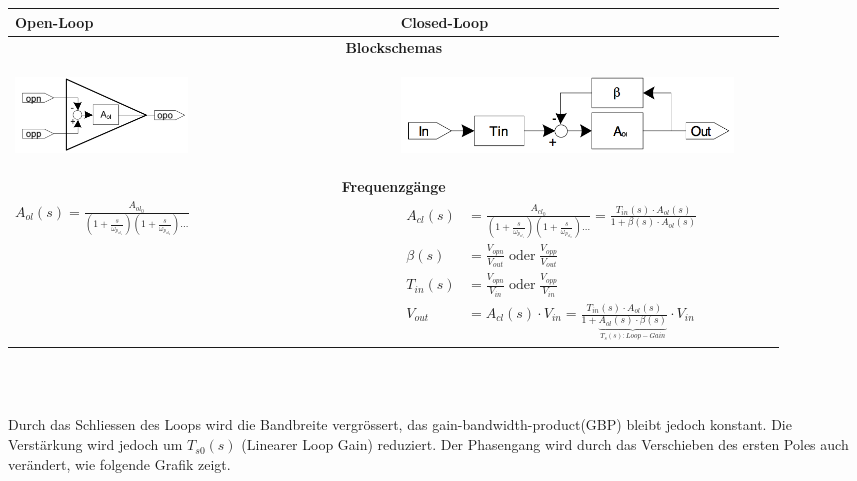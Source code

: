 \begin{tabular}{|p{0.45\linewidth}|p{0.45\linewidth}|}
	\hline
	\textbf{Open-Loop}
		& \textbf{Closed-Loop}\\
	\hline
	\multicolumn{2}{|c|}{\textbf{Blockschemas}}\\
	\hline
    \vspace{-7mm}
	\begin{center}
	 	\includegraphics[height=2cm, valign=t]{./pictures/opAmpOL.png}
	\end{center}
		& \vspace{-7mm}
          \begin{center}
			\includegraphics[height=2cm, valign=t]{./pictures/opAmpCL.png}
		  \end{center}\\
	\hline
	\multicolumn{2}{|c|}{\textbf{Frequenzgänge}}\\
	\hline
	\large{$A_{ol}(s)=\frac{A_{ol_0}}{(1+\frac{s}{\omega_{p_{ol_1}}})(1+\frac{s}{\omega_{p_{ol_2}}})\dots}$}
	& $\begin{aligned}
        A_{cl}(s) &= \frac{A_{cl_0}}{(1+\frac{s}{\omega_{p_{cl_1}}})(1+\frac{s}{\omega_{p_{cl_2}}})\dots} = \frac{T_{in}(s)\cdot A_{ol}(s)}{1+\beta(s)\cdot A_{ol}(s)}\\
		\beta(s) &= \frac{V_{opn}}{V_{out}}\;\text{oder}\;\frac{V_{opp}}{V_{out}}\\
		T_{in}(s) &= \frac{V_{opn}}{V_{in}}\;\text{oder}\;\frac{V_{opp}}{V_{in}}\\
        V_{out} &= A_{cl}(s)\cdot V_{in} = \frac{T_{in}(s)\cdot A_{ol}(s)}{1 + \underbrace{A_{ol}(s)\cdot \beta(s)}_{T_s(s):Loop-Gain}} \cdot V_{in}
	   \end{aligned}$\\
	\hline
\end{tabular}
\\ \\
\begin{minipage}{0.6\textwidth}
Durch das Schliessen des Loops wird die Bandbreite vergrössert, das gain-bandwidth-product(GBP) bleibt jedoch konstant. Die Verstärkung wird jedoch um $T_{s0}(s)$ (Linearer Loop Gain) reduziert. Der Phasengang wird durch das Verschieben des ersten Poles auch verändert, wie folgende Grafik zeigt.
\end{minipage}
